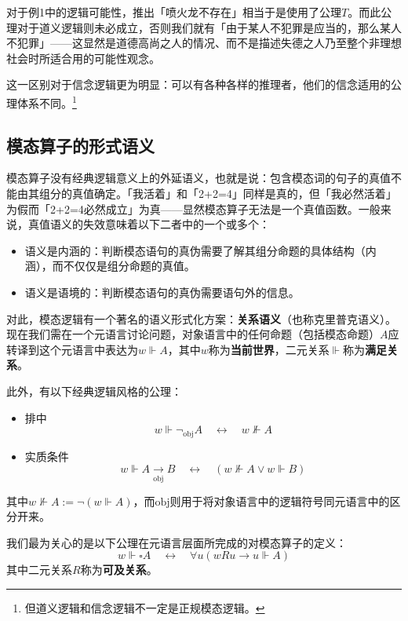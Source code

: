 \documentclass[fontset=ubuntu]{ctexart}
\begin{document}
			对于例1中的逻辑可能性，推出「喷火龙不存在」相当于是使用了公理\(T\)。而此公理对于道义逻辑则未必成立，否则我们就有「由于某人不犯罪是应当的，那么某人不犯罪」——这显然是道德高尚之人的情况、而不是描述失德之人乃至整个非理想社会时所适合用的可能性观念。

			这一区别对于信念逻辑更为明显：可以有各种各样的推理者，他们的信念适用的公理体系不同。\footnote{但道义逻辑和信念逻辑不一定是正规模态逻辑。}

		\subsection{模态算子的形式语义}

			模态算子没有经典逻辑意义上的外延语义，也就是说：包含模态词的句子的真值不能由其组分的真值确定。「我活着」和「2+2=4」同样是真的，但「我必然活着」为假而「2+2=4必然成立」为真——显然模态算子无法是一个真值函数。一般来说，真值语义的失效意味着以下二者中的一个或多个：
			
			\begin{itemize}
				\item 语义是内涵的：判断模态语句的真伪需要了解其组分命题的具体结构（内涵），而不仅仅是组分命题的真值。
				\item 语义是语境的：判断模态语句的真伪需要语句外的信息。
			\end{itemize}

			对此，模态逻辑有一个著名的语义形式化方案：\textbf{关系语义}（也称克里普克语义）。
			现在我们需在一个元语言讨论问题，对象语言中的任何命题（包括模态命题）\(A\)应转译到这个元语言中表达为\(w\Vdash A\)，其中\(w\)称为\textbf{当前世界}，二元关系\(\Vdash\)称为\textbf{满足关系}。
			
			此外，有以下经典逻辑风格的公理：
			\begin{itemize}
				\item 排中 \begin{equation}
					w\Vdash\lnot_\mathrm{obj} A\quad\longleftrightarrow\quad w \nVdash A
				\end{equation}
				\item 实质条件 \begin{equation}
					w\Vdash A\underset{\mathrm{obj}}{\longrightarrow} B\quad\longleftrightarrow\quad (w\nVdash A\lor w\Vdash B)
				\end{equation}
			\end{itemize}
			其中\(w\nVdash A:=\lnot(w\Vdash A)\)，而\(\mathrm{obj}\)则用于将对象语言中的逻辑符号同元语言中的区分开来。

			我们最为关心的是以下公理在元语言层面所完成的对模态算子的定义：
			\begin{equation}
				w\Vdash \square A \quad\longleftrightarrow\quad \forall u(wRu\to u\Vdash A)
			\end{equation}			
			其中二元关系\(R\)称为\textbf{可及关系}。
			
\end{document}
